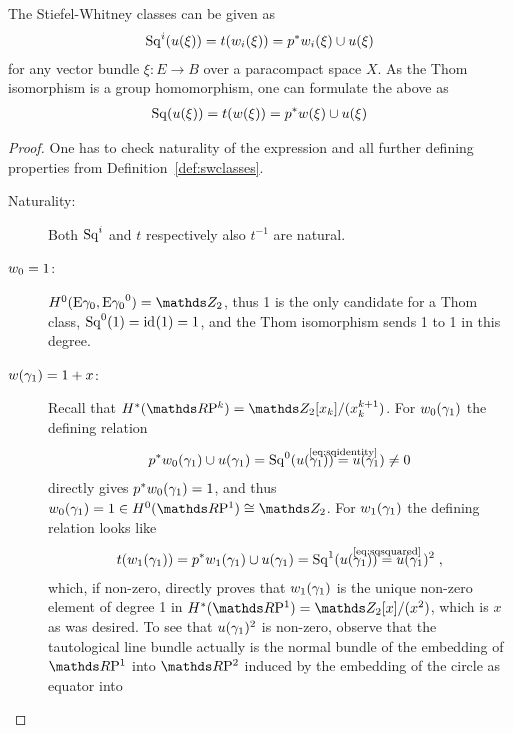 \begin{Thm}\label{thm:altdefswclasses}
  The Stiefel-Whitney classes can be given as
  \begin{gather*}
    \mathrm{Sq}^{i}({u}(\xi)) = t({w_{i}}(\xi)) = {p}^* {w_{i}}(\xi) \cup {u}(\xi)
  \end{gather*}
  for any vector bundle $\xi\colon E\to B$ over a paracompact space
  $X$. As the Thom isomorphism is a group homomorphism, one can
  formulate the above as
  \begin{gather*}
    \mathrm{Sq}({u}(\xi)) = t({w}(\xi)) = {p}^* {w}(\xi) \cup {u}(\xi)
  \end{gather*}
  \begin{proof}
    One has to check naturality of the expression and all further
    defining properties from Definition~\ref{def:swclasses}.
    \begin{description}
    \item[Naturality:] Both $\mathrm{Sq}^{i}$ and $t$ respectively also $t^{-1}$
      are natural.
    \item[$w_{0}=1$:]
      $\H^0(\thomspacepair{\E{\gamma_0}}) = \Zmod2$, thus 1 is the only
      candidate for a Thom class, $\mathrm{Sq}^{0}(1) = \mathrm{id}_{}(1) = 1$, and the Thom
      isomorphism sends 1 to 1 in this degree.
    \item[${w}(\gamma_1)=1+x$:]
      Recall that $\H^*(\RP k)=\Zmod2[x_k]/(x_k^{k+1})$.
      For ${w_{0}}(\gamma_1)$ the defining relation
      \begin{gather*}
        \pb p\w{0}{\gamma_1}\cup\u{\gamma_1}
        = \Sq 0(\u{\gamma_1})
        \cequalsby{\eqref{eq:sqidentity}}\u{\gamma_1} \neq 0
      \end{gather*}
      directly gives
      ${p}^*{w_{0}}(\gamma_1)=1$, and thus
      $\w{0}{\gamma_1}=1\in\H^0(\RP1)\cong\Zmod2$.
      For ${w_{1}}(\gamma_1)$ the defining relation looks like
      \begin{gather*}
        \thomiso(\w{1}{\gamma_1})
        = \pb p\w{1}{\gamma_1}\cup \u{\gamma_1}
        = \Sq 1(\u{\gamma_1})
        \cequalsby{\eqref{eq:sqsquared}}\u{\gamma_1}^2
        \;,
      \end{gather*}
      which, if non-zero, directly proves that ${w_{1}}(\gamma_1)$ is
      the unique non-zero element of degree 1 in
      $\H^*(\RP1)=\Zmod2[x]/(x^2)$, which is $x$ as was desired.
      To see that ${u}(\gamma_1)^2$ is non-zero,
      observe that the tautological line bundle
      actually is the normal bundle of the embedding of $\RP1$ into
      $\RP2$ induced by the embedding of the circle as equator into

\end{description}
\end{proof}
\end{Thm}

